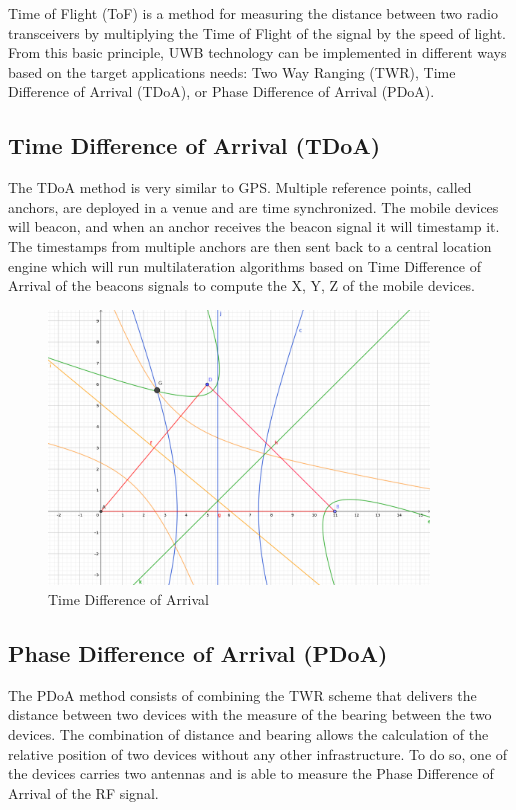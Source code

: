 \documentclass[\main/main.tex]{subfiles}
\begin{document}
Time of Flight (ToF) is a method for measuring the distance between two radio transceivers by multiplying the Time of Flight of the signal by the speed of light. From this basic principle, UWB technology can be implemented in different ways based on the target applications needs: Two Way Ranging (TWR), Time Difference of Arrival (TDoA), or Phase Difference of Arrival (PDoA).

\subsection{Time Difference of Arrival (TDoA)}
The TDoA method is very similar to GPS. Multiple reference points, called anchors, are deployed in a venue and are time synchronized. The mobile devices will beacon, and when an anchor receives the beacon signal it will timestamp it. The timestamps from multiple anchors are then sent back to a central location engine which will run multilateration algorithms based on Time Difference of Arrival of the beacons signals to compute the X, Y, Z of the mobile devices.

\begin{figure}[H]
    \centering
    \includegraphics[width=0.9\textwidth]{tdoa.png}
    \caption{Time Difference of Arrival}
    \label{fig:tdoa}
\end{figure}

\subsection{Phase Difference of Arrival (PDoA)}
The PDoA method consists of combining the TWR scheme that delivers the distance between two devices with the measure of the bearing between the two devices. The combination of distance and bearing allows the calculation of the relative position of two devices without any other infrastructure. To do so, one of the devices carries two antennas and is able to measure the Phase Difference of Arrival of the RF signal.
\end{document}

